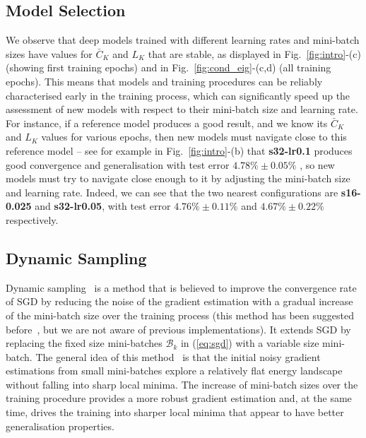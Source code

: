 \documentclass[10pt,journal,compsoc]{IEEEtran}
\begin{document}
  


\subsection{Model Selection}

We observe that deep models trained with different learning rates and mini-batch sizes have values for $\bar{C}_K$ and $L_K$ that are stable, as displayed in Fig.~\ref{fig:intro}-(c) (showing first training epochs) and in Fig.~\ref{fig:cond_eig}-(c,d) (all training epochs).
This means that models and training procedures can be reliably characterised early in the training process, which can significantly speed up the assessment of new models with respect to their mini-batch size and learning rate.
For instance, if a reference model produces a good result, and we know its $\bar{C}_K$ and $L_K$ values for various epochs, then new models must navigate close to this reference model -- see for example in Fig.~\ref{fig:intro}-(b) that {\bf s32-lr0.1} produces good convergence and generalisation with test error $4.78\%\pm0.05\%$ , so new models must try to navigate close enough to it by adjusting the mini-batch size and learning rate.
Indeed, we can see that the two nearest configurations are {\bf s16-0.025} and {\bf s32-lr0.05}, with test error $4.76\%\pm0.11\%$ and $4.67\%\pm0.22\%$ respectively.



\subsection{Dynamic Sampling}
\label{sec:dynamic_sampling}

Dynamic sampling~\cite{friedlander2012hybrid, byrd2012sample} is a method that is believed to improve the convergence rate of SGD by reducing the noise of the gradient estimation with a gradual increase of the mini-batch size over the training process (this method has been suggested before~\cite{friedlander2012hybrid, byrd2012sample}, but we are not aware of previous implementations).  It extends SGD by replacing the fixed size mini-batches $\mathcal{B}_k$ in (\ref{eq:sgd}) with a variable size mini-batch.  
The general idea of this method~\cite{friedlander2012hybrid, byrd2012sample} is that the initial noisy gradient estimations from small mini-batches explore a relatively flat energy landscape without falling into sharp local minima. %
The increase of mini-batch sizes over the training procedure provides a more robust gradient estimation and, at the same time, drives the training into sharper local minima that appear to have better generalisation properties.
\end{document}
